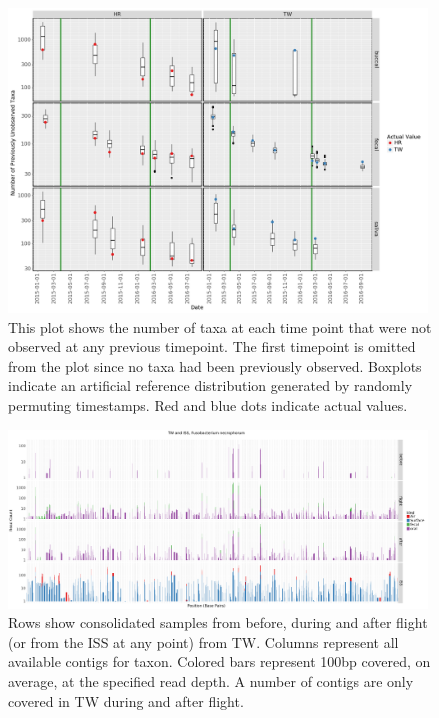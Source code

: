 \begin{figure}
  \begin{center}
    \includegraphics[width=0.99\textwidth]{figs/twins_taxa_flux.png}
	\caption{\small{
	    This plot shows the number of taxa at each time point that were not observed at any previous timepoint. The first timepoint is omitted from the plot since no taxa had been previously observed. Boxplots indicate an artificial reference distribution generated by randomly permuting timestamps. Red and blue dots indicate actual values.
	}}
    \label{fig:taxaflux}
  \end{center}
\end{figure}

\begin{figure}
  \begin{center}
    \includegraphics[width=0.99\textwidth]{figs/f_necro_read_recruit.png}
	\caption{\small{
	    Rows show consolidated samples from before, during and after flight (or from the ISS at any point) from TW. Columns represent all available contigs for taxon. Colored bars represent 100bp covered, on average, at the specified read depth. A number of contigs are only covered in TW during and after flight.
	}}
    \label{fig:fnecro}
  \end{center}
\end{figure}


